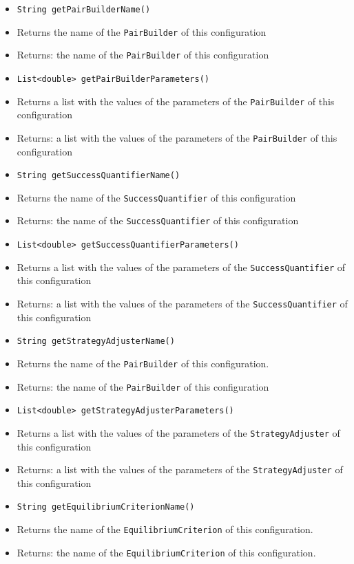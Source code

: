 \documentclass[parskip=full,11pt]{scrartcl}
\begin{document}
\begin{itemize}
	\item \texttt{String getPairBuilderName()}
	\item[] Returns the name of the \texttt{PairBuilder} of this configuration
	\item[] Returns: the name of the \texttt{PairBuilder} of this configuration

	\item \texttt{List<double> getPairBuilderParameters()}
	\item[] Returns a list with the values of the parameters of the \texttt{PairBuilder} of this configuration
	\item[] Returns: a list with the values of the parameters of the \texttt{PairBuilder} of this configuration

	\item \texttt{String getSuccessQuantifierName()}
	\item[] Returns the name of the \texttt{SuccessQuantifier} of this configuration
	\item[] Returns: the name of the \texttt{SuccessQuantifier} of this configuration

	\item \texttt{List<double> getSuccessQuantifierParameters()}
	\item[] Returns a list with the values of the parameters of the \texttt{SuccessQuantifier} of this configuration
	\item[] Returns: a list with the values of the parameters of the \texttt{SuccessQuantifier} of this configuration

	\item \texttt{String getStrategyAdjusterName()}
	\item[] Returns the name of the \texttt{PairBuilder} of this configuration.
	\item[] Returns: the name of the \texttt{PairBuilder} of this configuration
\newpage
	\item \texttt{List<double> getStrategyAdjusterParameters()}
	\item[] Returns a list with the values of the parameters of the \texttt{StrategyAdjuster} of this configuration
	\item[] Returns: a list with the values of the parameters of the \texttt{StrategyAdjuster} of this configuration


	\item \texttt{String getEquilibriumCriterionName()}
	\item[] Returns the name of the \texttt{EquilibriumCriterion} of this configuration.
	\item[] Returns: the name of the \texttt{EquilibriumCriterion} of this configuration.


\end{itemize}
\end{document}
